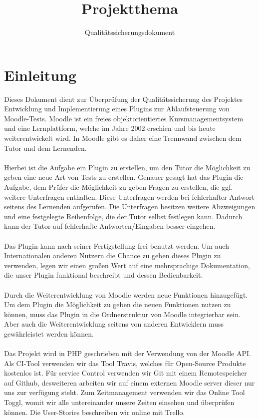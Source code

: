 \documentclass[accentcolor=tud0b,12pt,paper=a4]{tudreport}
\title{Projektthema}
\subtitle{Qualitätssicherungsdokument}
\begin{document}
	\maketitle
	\tableofcontents 
	
	\chapter{Einleitung}
		
Dieses Dokument dient zur Überprüfung der Qualitätssicherung des Projektes Entwicklung und Implementierung eines Plugins zur Ablaufsteuerung von Moodle-Tests. 
Moodle ist ein freies objektorientiertes Kursmanagementsystem und eine Lernplattform, welche im Jahre 2002 erschien und bis heute weiterentwickelt wird. In Moodle gibt es daher eine Trennwand zwischen dem Tutor und dem Lernenden. 
\\
\\
Hierbei ist die Aufgabe ein Plugin zu erstellen, um den Tutor die Möglichkeit zu geben eine neue Art von Tests zu erstellen. Genauer gesagt hat das Plugin die Aufgabe, dem Prüfer die Möglichkeit zu geben Fragen zu erstellen, die ggf. weitere Unterfragen enthalten. Diese Unterfragen werden bei fehlerhafter Antwort seitens des Lernenden aufgerufen. Die Unterfragen besitzen weitere Abzweigungen und eine festgelegte Reihenfolge, die der Tutor selbst festlegen kann. Dadurch kann der Tutor auf fehlerhafte Antworten/Eingaben besser eingehen. 
\\
\\
Das Plugin kann nach seiner Fertigstellung frei benutzt werden. Um auch Internationalen anderen Nutzern die Chance zu geben dieses Plugin zu verwenden, legen wir einen großen Wert auf eine mehrsprachige Dokumentation, die unser Plugin funktional beschreibt und dessen Bedienbarkeit.
\\
\\
Durch die Weiterentwicklung von Moodle werden neue Funktionen hinzugefügt. Um dem Plugin die Möglichkeit zu geben die neuen Funktionen nutzen zu können, muss das Plugin in die Ordnerstruktur von Moodle integrierbar sein. Aber auch die Weiterentwicklung seitens von anderen Entwicklern muss gewährleistet werden können.
\\
\\
Das Projekt wird in PHP geschrieben mit der Verwendung von der Moodle API.
Als CI-Tool verwenden wir das Tool Travis, welches für Open-Source Produkte kostenlos ist.
Für service Control verwenden wir Git mit einem Remotespeicher auf Github, desweiteren arbeiten wir auf einem externen Moodle server dieser nur uns zur verfügung steht.
Zum Zeitmanagement verwenden wir das Online Tool Toggl, womit wir alle untereinander unsere Zeiten einsehen und überprüfen können. Die User-Stories beschreiben wir online mit Trello.
\end{document}
